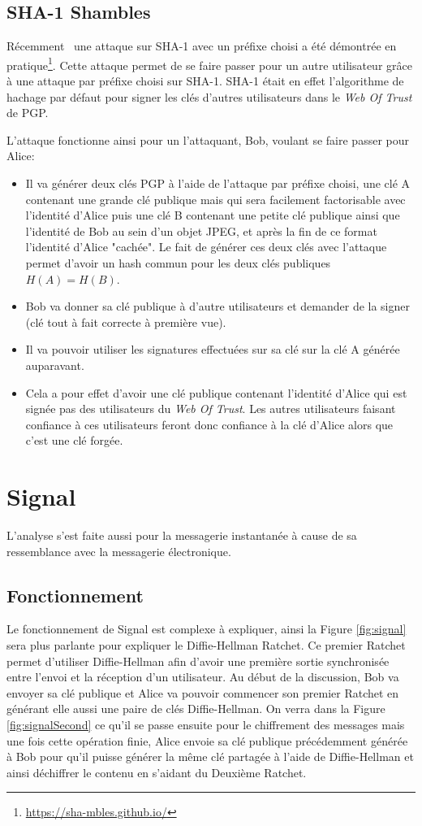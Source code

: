 \subsection{SHA-1 Shambles}
Récemment~\cite{journals/iacr/LeurentP20} une attaque sur SHA-1 avec un préfixe choisi a été démontrée en pratique\footnote{\url{https://sha-mbles.github.io/}}. Cette attaque permet de se faire passer pour un autre utilisateur grâce à une attaque par préfixe choisi sur SHA-1. SHA-1 était en effet l'algorithme de hachage par défaut pour signer les clés d'autres utilisateurs dans le \textit{Web Of Trust} de PGP.

L'attaque fonctionne ainsi pour un l'attaquant, Bob, voulant se faire passer pour Alice: 
\begin{itemize}
	\item Il va générer deux clés PGP à l'aide de l'attaque par préfixe choisi, une clé A contenant une grande clé publique mais qui sera facilement factorisable avec l'identité d'Alice puis une clé B contenant une petite clé publique ainsi que l'identité de Bob au sein d'un objet JPEG, et après la fin de ce format l'identité d'Alice "cachée". Le fait de générer ces deux clés avec l'attaque permet d'avoir un hash commun pour les deux clés publiques $H(A) = H(B)$.
	\item Bob va donner sa clé publique à d'autre utilisateurs et demander de la signer (clé tout à fait correcte à première vue).
	\item Il va pouvoir utiliser les signatures effectuées sur sa clé sur la clé A générée auparavant.
	\item Cela a pour effet d'avoir une clé publique contenant l'identité d'Alice qui est signée pas des utilisateurs du \textit{Web Of Trust}. Les autres utilisateurs faisant confiance à ces utilisateurs feront donc confiance à la clé d'Alice alors que c'est une clé forgée.
\end{itemize}
\section{Signal}
L'analyse s'est faite aussi pour la messagerie instantanée à cause de sa ressemblance avec la messagerie électronique. 
\subsection{Fonctionnement}
Le fonctionnement de Signal est complexe à expliquer, ainsi la Figure \ref{fig:signal} sera plus parlante pour expliquer le Diffie-Hellman Ratchet. Ce premier Ratchet permet d'utiliser Diffie-Hellman afin d'avoir une première sortie synchronisée entre l'envoi et la réception d'un utilisateur. Au début de la discussion, Bob va envoyer sa clé publique et Alice va pouvoir commencer son premier Ratchet en générant elle aussi une paire de clés Diffie-Hellman. On verra dans la Figure \ref{fig:signalSecond} ce qu'il se passe ensuite pour le chiffrement des messages mais une fois cette opération finie, Alice envoie sa clé publique précédemment générée à Bob pour qu'il puisse générer la même clé partagée à l'aide de Diffie-Hellman et ainsi déchiffrer le contenu en s'aidant du Deuxième Ratchet.

